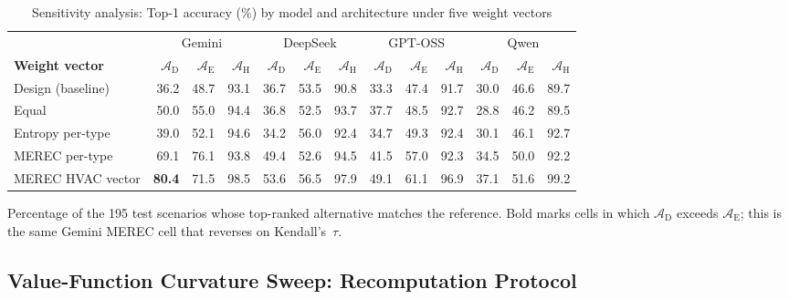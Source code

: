 \documentclass[11pt]{article}
\begin{document}
\begin{table}[htbp]
\centering
\footnotesize
\centering
\renewcommand{\arraystretch}{1.10}
\setlength{\tabcolsep}{4pt}
\caption{Sensitivity analysis: Top-1 accuracy (\%) by model and architecture under five weight vectors}
\label{tab:sensitivity_top1}
\begin{tabular}{@{}l rrr rrr rrr rrr@{}}
\toprule
 & \multicolumn{3}{c}{Gemini} & \multicolumn{3}{c}{DeepSeek} & \multicolumn{3}{c}{GPT-OSS} & \multicolumn{3}{c}{Qwen} \\
\cmidrule(lr){2-4}\cmidrule(lr){5-7}\cmidrule(lr){8-10}\cmidrule(lr){11-13}
\textbf{Weight vector} & $\mathcal{A}_{\text{D}}$ & $\mathcal{A}_{\text{E}}$ & $\mathcal{A}_{\text{H}}$ & $\mathcal{A}_{\text{D}}$ & $\mathcal{A}_{\text{E}}$ & $\mathcal{A}_{\text{H}}$ & $\mathcal{A}_{\text{D}}$ & $\mathcal{A}_{\text{E}}$ & $\mathcal{A}_{\text{H}}$ & $\mathcal{A}_{\text{D}}$ & $\mathcal{A}_{\text{E}}$ & $\mathcal{A}_{\text{H}}$ \\
\midrule
Design (baseline)  & 36.2 & 48.7 & 93.1 & 36.7 & 53.5 & 90.8 & 33.3 & 47.4 & 91.7 & 30.0 & 46.6 & 89.7 \\
Equal              & 50.0 & 55.0 & 94.4 & 36.8 & 52.5 & 93.7 & 37.7 & 48.5 & 92.7 & 28.8 & 46.2 & 89.5 \\
\midrule
Entropy per-type   & 39.0 & 52.1 & 94.6 & 34.2 & 56.0 & 92.4 & 34.7 & 49.3 & 92.4 & 30.1 & 46.1 & 92.7 \\
\midrule
MEREC per-type     & 69.1 & 76.1 & 93.8 & 49.4 & 52.6 & 94.5 & 41.5 & 57.0 & 92.3 & 34.5 & 50.0 & 92.2 \\
MEREC HVAC vector  & \textbf{80.4} & 71.5 & 98.5 & 53.6 & 56.5 & 97.9 & 49.1 & 61.1 & 96.9 & 37.1 & 51.6 & 99.2 \\
\bottomrule
\end{tabular}
\renewcommand{\arraystretch}{1.0}
\setlength{\tabcolsep}{6pt}
\end{table}

Percentage of the 195 test scenarios whose top-ranked alternative matches
the reference. Bold marks cells in which $\mathcal{A}_{\text{D}}$ exceeds
$\mathcal{A}_{\text{E}}$; this is the same Gemini MEREC cell that reverses
on Kendall's~$\tau$.

\subsection{Value-Function Curvature Sweep: Recomputation Protocol}
\label{app:alpha_sweep}
\end{document}
